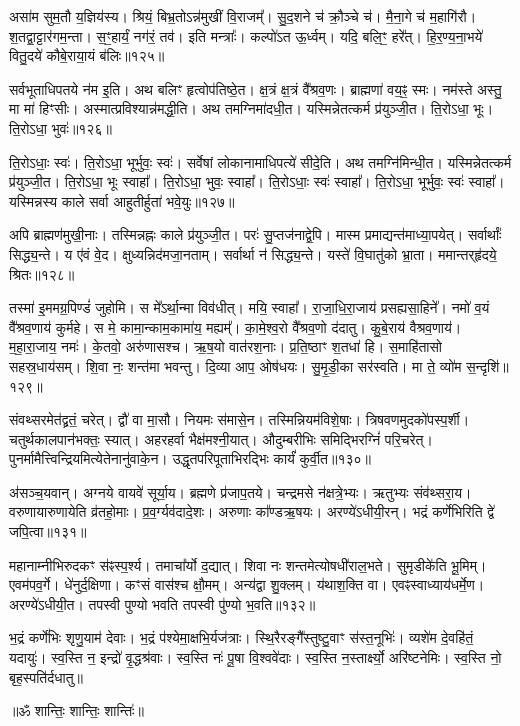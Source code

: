 असा॑म सुम॒तौ य॒ज्ञिय॑स्य। श्रियं॒ बिभ्र॒तोऽन्न॑मुखीं वि॒राजम्‌᳚। 
सु॒द॒\ar{}शने च॑ क्रौ॒ञ्चे च॑। मै॒ना॒गे च॑ म॒हागि॑रौ। 
श॒तद्वा॒ट्टार॑गम॒न्ता। स॒ꣳ॒हार्यं॒ नग॑रं॒ तव॑। 
इति मन्त्राः᳚। कल्पो॑ऽत ऊ॒र्ध्वम्। यदि॒ बलि॒ꣳ॒ हरे᳚त्। 
हि॒र॒ण्य॒ना॒भये॑ वितु॒दये॑ कौबे॒राया॒यं ब॑लिः॥१२५॥


सर्वभूताधिपतये न॑म इ॒ति। अथ बलिꣳ हृत्वोप॑तिष्ठे॒त। 
क्ष॒त्रं क्ष॒त्रं वै᳚श्रव॒णः। ब्राह्मणा॑ वय॒ꣴ॒ स्मः। 
नम॑स्ते अस्तु॒ मा मा॑ हिꣳसीः। अस्मात्प्रविश्यान्न॑मद्धी॒ति। 
अथ तमग्निमा॑दधी॒त। यस्मिन्नेतत्कर्म प्र॑युञ्जी॒त। 
ति॒रोऽधा॒ भूः। ति॒रोऽधा॒ भुवः॑॥१२६॥


ति॒रोऽधाः॒ स्वः॑। ति॒रोऽधा॒ भूर्भुवः॒ स्वः॑। 
सर्वेषां लोकानामाधिपत्ये॑ सीदे॒ति। अथ तमग्नि॑मिन्धी॒त। 
यस्मिन्नेतत्कर्म प्र॑युञ्जी॒त। ति॒रोऽधा॒ भूः स्वाहा᳚। 
ति॒रोऽधा॒ भुवः॒ स्वाहा᳚। ति॒रोऽधाः॒ स्वः॑ स्वाहा᳚। 
ति॒रोऽधा॒ भूर्भुवः॒ स्वः॑ स्वाहा᳚। 
यस्मिन्नस्य काले सर्वा आहुतीर्\mbox{}हुता॑ भवे॒युः॥१२७॥


अपि ब्राह्मण॑मुखी॒नाः। तस्मिन्नह्नः काले प्र॑युञ्जी॒त। 
परः॑ सु॒प्तज॑नाद्वे॒पि। मास्म प्रमाद्यन्त॑माध्या॒पयेत्। 
सर्वार्थाः᳚ सिद्ध्य॒न्ते। य ए॑वं वे॒द। 
क्षुध्यन्निद॑मजा॒नताम्। सर्वार्था न॑ सिद्ध्य॒न्ते। 
यस्ते॑ वि॒घातु॑को भ्रा॒ता। ममान्तर्‌हृ॑दये॒ श्रितः॥१२८॥


तस्मा॑ इ॒ममग्र॒पिण्डं॑ जुहोमि। स मे᳚ऽर्था॒न्मा विव॑धीत्। 
मयि॒ स्वाहा᳚। रा॒जा॒धि॒रा॒जाय॑ प्रसह्यसा॒हिने᳚। 
नमो॑ व॒यं वै᳚श्रव॒णाय॑ कुर्महे। स मे॒ कामा॒न्काम॒कामा॑य॒ मह्यम्‌᳚। 
का॒मे॒श्व॒रो वै᳚श्रव॒णो द॑दातु। कु॒बे॒राय॑ वैश्रव॒णाय॑। 
म॒हा॒रा॒जाय॒ नमः॑। के॒तवो॒ अरु॑णासश्च। 
ऋ॒ष॒यो वात॑रश॒नाः। प्र॒ति॒ष्ठाꣳ श॒तधा॑ हि। 
स॒माहि॑तासो सहस्र॒धाय॑सम्। शि॒वा नः॒ शन्त॑मा भवन्तु। 
दि॒व्या आप॒ ओष॑धयः। सु॒मृ॒डी॒का सर॑स्वति। 
मा ते॒ व्यो॑म स॒न्दृशि॑॥१२९॥\anuvakamend


संवथ्सरमेत॑द्व्रतं॒ चरेत्। द्वौ॑ वा मा॒सौ। 
नियमः स॑मासे॒न। तस्मिन्नियम॑विशे॒षाः। 
त्रिषवणमुदको॑पस्प॒र्शी। चतुर्थकालपान॑भक्तः॒ स्यात्। 
अहरहर्वा भैक्ष॑मश्नी॒यात्। औदुम्बरीभिः समिद्भिरग्निं॑ परि॒चरेत्। 
पुनर्मामैत्त्विन्द्रियमि\-त्येतेनानु॑वाके॒न। उद्धृतपरिपूताभि\-रद्भिः कार्यं॑ कुर्वी॒त॥१३०॥


अ॑सञ्च॒यवान्। अग्नये वायवे॑ सूर्या॒य। 
ब्रह्मणे प्र॑जाप॒तये। चन्द्रमसे न॑क्षत्रे॒भ्यः। 
ऋतुभ्यः संव॑थ्सरा॒य। वरुणायारुणायेति व्र॑तहो॒माः। 
प्र॒व॒र्ग्यव॑दादे॒शः। अरुणाः का᳚ण्डऋ॒षयः। 
अरण्ये॑ऽधीयी॒रन्। भद्रं कर्णेभिरिति द्वे॑ जपि॒त्वा॥१३१॥


महानाम्नीभिरुदकꣳ स॑ꣴस्प॒र्श्य। तमाचा᳚र्यो द॒द्यात्। 
शिवा नः शन्तमेत्योषधी॑राल॒भते। सुमृडीके॑ति भू॒मिम्। 
एवम॑पव॒र्गे। धे॑नुर्द॒क्षिणा। कꣳसं वास॑श्च क्षौ॒मम्। 
अन्य॑द्वा शु॒क्लम्। य॑थाश॒क्ति वा। एवꣴस्वाध्याय॑धर्मे॒ण। 
अरण्ये॑ऽधीयी॒त। तपस्वी पुण्यो भवति तपस्वी पु॑ण्यो भ॒वति॥१३२॥\anuvakamend


भ॒द्रं कर्णे॑भिः शृणु॒याम॑ देवाः। भ॒द्रं प॑श्येमा॒क्षभि॒र्यज॑त्राः। 
स्थि॒रैरङ्गै᳚स्तुष्टु॒वाꣳ स॑स्त॒नूभिः॑। व्यशे॑म दे॒वहि॑तं॒ यदायुः॑। 
स्व॒स्ति न॒ इन्द्रो॑ वृ॒द्धश्र॑वाः। स्व॒स्ति नः॑ पू॒षा वि॒श्ववे॑दाः। 
स्व॒स्ति न॒स्तार्क्ष्यो॒ अरि॑ष्टनेमिः। स्व॒स्ति नो॒ बृह॒स्पति॑र्दधातु॥\\

\centerline{॥ॐ शान्तिः॒ शान्तिः॒ शान्तिः॑॥}
